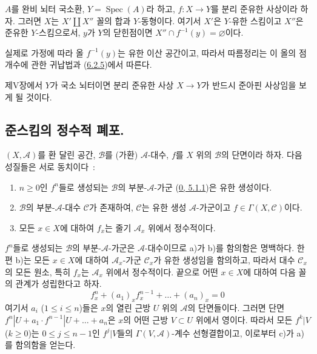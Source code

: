 \begin{corollary}[6.2.6]
\label{II.6.2.6-ko}
$A$를 완비 뇌터 국소환, $Y=\operatorname{Spec}(A)$라 하고,
$f:X\to Y$를 분리 준유한 사상이라 하자. 그러면 $X$는
$X'\amalg X''$ 꼴의 합과 $Y$-동형이다. 여기서 $X'$은 $Y$-유한
스킴이고 $X''$은 준유한 $Y$-스킴으로서, $y$가 $Y$의 닫힌점이면
$X''\cap f^{-1}(y)=\varnothing$이다.
\end{corollary}

실제로 가정에 따라 올 $f^{-1}(y)$는 유한 이산 공간이고, 따라서
따름정리는 이 올의 점 개수에 관한 귀납법과
(\hyperref[II.6.2.5-ko]{6.2.5})에서 따른다.

\begin{remark}[6.2.7]
\label{II.6.2.7-ko}
제V장에서 $Y$가 국소 뇌터이면 분리 준유한 사상 $X\to Y$가
반드시 준아핀 사상임을 보게 될 것이다.
\end{remark}

\subsection{준스킴의 정수적 폐포.}
\label{subsection:II.6.3-ko}

\begin{proposition}[6.3.1]
\label{II.6.3.1-ko}
$(X,\mathcal{A})$를 환 달린 공간, $\mathcal{B}$를 (가환)
$\mathcal{A}$-대수, $f$를 $X$ 위의 $\mathcal{B}$의 단면이라 하자.
다음 성질들은 서로 동치이다~:
\begin{enumerate}
\item[a)] $n\geq 0$인 $f^n$들로 생성되는 $\mathcal{B}$의
부분-$\mathcal{A}$-가군 (\hyperref[0.5.1.1-ko]{0, 5.1.1})은 유한
생성이다.
\item[b)] $\mathcal{B}$의 부분-$\mathcal{A}$-대수 $\mathcal{C}$가
존재하여, $\mathcal{C}$는 유한 생성 $\mathcal{A}$-가군이고
$f\in\Gamma(X,\mathcal{C})$이다.
\item[c)] 모든 $x\in X$에 대하여 $f_x$는 줄기 $\mathcal{A}_x$ 위에서
정수적이다.
\end{enumerate}
\end{proposition}


$f^n$들로 생성되는 $\mathcal{B}$의 부분-$\mathcal{A}$-가군은
$\mathcal{A}$-대수이므로 a)가 b)를 함의함은 명백하다. 한편 b)는 모든
$x\in X$에 대하여 $\mathcal{A}_x$-가군 $\mathcal{C}_x$가 유한
생성임을 함의하고, 따라서 대수 $\mathcal{C}_x$의 모든 원소, 특히
$f_x$는 $\mathcal{A}_x$ 위에서 정수적이다. 끝으로 어떤 $x\in X$에
대하여 다음 꼴의 관계가 성립한다고 하자.
\[
f_x^n+(a_1)_xf_x^{n-1}+\ldots+(a_n)_x=0
\]
여기서 $a_i$ ($1\leq i\leq n$)들은 $x$의 열린 근방 $U$ 위의
$\mathcal{A}$의 단면들이다. 그러면 단면
$f^n|U+a_1\cdot f^{n-1}|U+\ldots+a_n$은 $x$의 어떤 근방
$V\subset U$ 위에서 영이다. 따라서 모든 $f^k|V$ ($k\geq0$)는
$0\leq j\leq n-1$인 $f^j|V$들의 $\Gamma(V,\mathcal{A})$-계수 선형결합이고,
이로부터 c)가 a)를 함의함을 얻는다.

